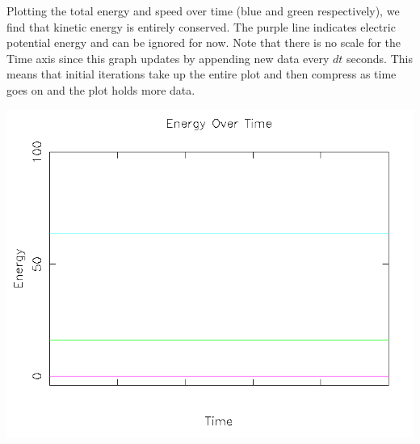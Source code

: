 \documentclass{article}
\begin{document}
Plotting the total energy and speed over time (blue and green respectively),
we find that kinetic energy is entirely conserved.
The purple line indicates electric potential energy and can be ignored for now.
Note that there is no scale for the Time axis since this graph updates by appending new data every $dt$ seconds.
This means that initial iterations take up the entire plot and then compress as time goes on
and the plot holds more data.
\\
\begin{center}
    \includegraphics[scale=0.5]{uncharged_2_particles_1D_energy}
\end{center}
\end{document}

